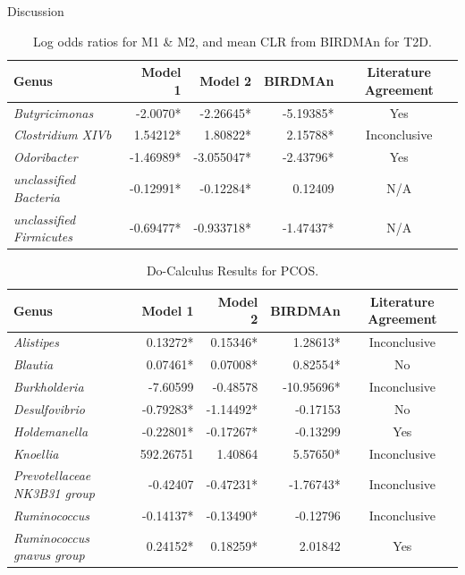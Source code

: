 \documentclass[final]{beamer}
\begin{document}
\begin{frame}[t]
\begin{columns}[t]
\begin{column}{0.65\textwidth}
\begin{columns}[t]
\begin{column}{0.5\linewidth}
\begin{block}{Discussion}
      \begin{table}
        
        \centering
        \begin{tabular}{l r r r c}
          \toprule
          \textbf{Genus} & \textbf{Model 1} & \textbf{Model 2} & \textbf{BIRDMAn} & \textbf{Literature Agreement} \\
          \midrule
          \textit{Butyricimonas} & -2.0070* & -2.26645* & -5.19385* & Yes \\
          \textit{Clostridium XIVb} & 1.54212* & 1.80822* & 2.15788* & Inconclusive \\
          \textit{Odoribacter} & -1.46989* & -3.055047* & -2.43796* & Yes \\
          \textit{unclassified Bacteria} & -0.12991* & -0.12284* & 0.12409 & N/A \\
          \textit{unclassified Firmicutes} & -0.69477* & -0.933718* & -1.47437* & N/A \\
          \bottomrule
        \end{tabular}
        \caption{Log odds ratios for M1 \& M2, and mean CLR from BIRDMAn for T2D.}
      \end{table}
      
      \begin{table}
        \centering
        \begin{tabular}{l r r r c}
          \toprule
          \textbf{Genus} & \textbf{Model 1} & \textbf{Model 2} & \textbf{BIRDMAn} & \textbf{Literature Agreement} \\
          \midrule
          \textit{Alistipes} & 0.13272* & 0.15346* & 1.28613* & Inconclusive \\
          \textit{Blautia} & 0.07461* & 0.07008* & 0.82554* & No \\
          \textit{Burkholderia} & -7.60599 & -0.48578 & -10.95696* & Inconclusive \\
          \textit{Desulfovibrio} & -0.79283* & -1.14492* & -0.17153 & No \\
          \textit{Holdemanella} & -0.22801* & -0.17267* & -0.13299 & Yes \\
          \textit{Knoellia} & 592.26751 & 1.40864 & 5.57650* & Inconclusive \\
          \textit{Prevotellaceae NK3B31 group} & -0.42407 & -0.47231* & -1.76743* & Inconclusive \\
          \textit{Ruminococcus} & -0.14137* & -0.13490* & -0.12796 & Inconclusive \\
          \textit{Ruminococcus gnavus group} & 0.24152* & 0.18259* & 2.01842 & Yes \\
          \bottomrule
        \end{tabular}
        \caption{Do-Calculus Results for PCOS.}
      \end{table}
    \end{block}
    \end{column}


\end{columns}
\end{column}
\end{columns}
\end{frame}
\end{document}
